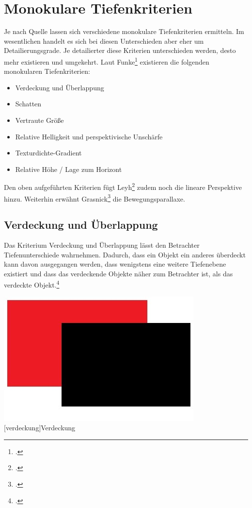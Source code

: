 \section{Monokulare Tiefenkriterien}
Je nach Quelle lassen sich verschiedene monokulare Tiefenkriterien ermitteln. Im wesentlichen handelt es sich bei diesen Unterschieden aber eher um Detailierungsgrade. Je detailierter diese Kriterien unterschieden werden, desto mehr existieren und umgekehrt. Laut Funke\footcite[Vgl.][]{heidXX} existieren die folgenden monokularen Tiefenkriterien:

\begin{itemize}
\item Verdeckung und Überlappung
\item Schatten
\item Vertraute Größe
\item Relative Helligkeit und perspektivische Unschärfe
\item Texturdichte-Gradient
\item Relative Höhe / Lage zum Horizont
\end{itemize}

Den oben aufgeführten Kriterien fügt Leyh\footcite[Vgl.][]{leyh10} zudem noch die lineare Perspektive hinzu. Weiterhin erwähnt Grasnick\footcite[Vgl.][]{Gras16} die Bewegungsparallaxe.

\subsection{Verdeckung und Überlappung}
Das Kriterium Verdeckung und Überlappung lässt den Betrachter Tiefenunterschiede wahrnehmen. Dadurch, dass ein Objekt ein anderes überdeckt kann davon ausgegangen werden, dass wenigstens eine weitere Tiefenebene existiert und dass das verdeckende Objekte näher zum Betrachter ist, als das verdeckte Objekt.\footcite[Vgl.]{heidXX}

\vspace{1em}
\begin{minipage}{\linewidth}
	\centering
	\includegraphics[width=0.7\linewidth]{images/verdeckung.jpg}
	[verdeckung]{Verdeckung}
	\label{fig:verdeckung}
\end{minipage}
\vspace{1em} 

